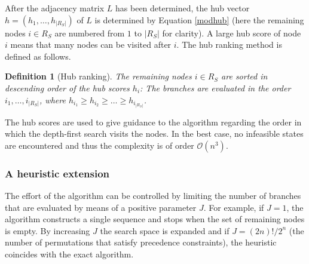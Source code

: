 \documentclass[dissertation,draft*]{aaltoseries}
\newtheorem*{definition}{Definition}
\begin{document}
After the adjacency matrix $L$ has been determined, the hub vector $h=(h_1,\ldots,h_{|R_S|})$ of $L$ is determined by 
Equation \eqref{modhub} (here the remaining nodes $i \in R_S$ are numbered from $1$ to $|R_S|$ for clarity). 
A large hub score of node $i$ means that many 
nodes can be visited after $i$. 
The hub ranking method is defined as follows.
\begin{definition}[Hub ranking]
The remaining nodes $i \in R_S$ are sorted in descending order of the hub scores $h_i$: 
The branches are evaluated in the order $i_1,\ldots,i_{|R_S|}$, where
$h_{i_1} \geq h_{i_2} \geq \ldots \geq h_{i_{|R_S|}}$.
\end{definition}

The hub scores are used to give guidance to the algorithm regarding the order in which the 
depth-first search visits the nodes. In the best case, no infeasible states are encountered and thus 
the complexity is of order $\mathcal{O}(n^3)$.

\subsubsection{A heuristic extension}
\label{rrheuristic}
The effort of the algorithm can be controlled by limiting the number of branches that are evaluated
by means of a positive parameter $J$. For example, if $J=1$, the algorithm constructs a single sequence
and stops when the set of remaining nodes is empty. By increasing $J$ the search space is expanded and
if $J = (2n)!/2^n$ (the number of permutations that satisfy precedence constraints), the heuristic
coincides with the exact algorithm.
\end{document}
